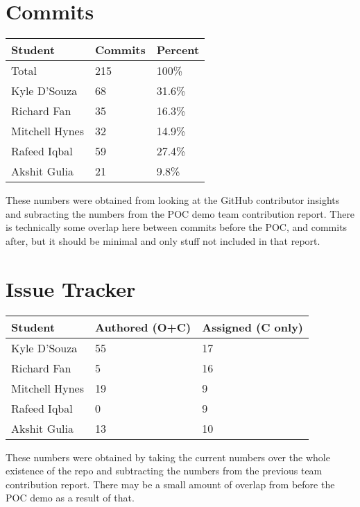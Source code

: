 \documentclass{article}
\begin{document}
\section{Commits}

\begin{table}[H]
  \centering
  \begin{tabular}{lll}
    \toprule
    \textbf{Student} & \textbf{Commits} & \textbf{Percent}\\
    \midrule
    Total & 215 & 100\% \\
    Kyle D'Souza & 68 & 31.6\% \\
    Richard Fan & 35 & 16.3\% \\
    Mitchell Hynes & 32 & 14.9\% \\
    Rafeed Iqbal & 59 & 27.4\% \\
    Akshit Gulia & 21 & 9.8\% \\
    \bottomrule
  \end{tabular}
\end{table}

These numbers were obtained from looking at the GitHub contributor
insights and subracting the numbers from the POC demo team contribution report.
There is technically some overlap here between commits before the
POC, and commits after, but it should be minimal and only stuff not
included in that report.

\section{Issue Tracker}

\begin{table}[H]
  \centering
  \begin{tabular}{lll}
    \toprule
    \textbf{Student} & \textbf{Authored (O+C)} & \textbf{Assigned (C only)}\\
    \midrule
    Kyle D'Souza & 55 & 17 \\
    Richard Fan & 5 & 16 \\
    Mitchell Hynes & 19 & 9 \\
    Rafeed Iqbal & 0 & 9 \\
    Akshit Gulia & 13 & 10 \\
    \bottomrule
  \end{tabular}
\end{table}

These numbers were obtained by taking the current numbers over the
whole existence of the repo and subtracting the numbers from the
previous team contribution report.
There may be a small amount of overlap from before the POC demo as a
result of that.
\end{document}
